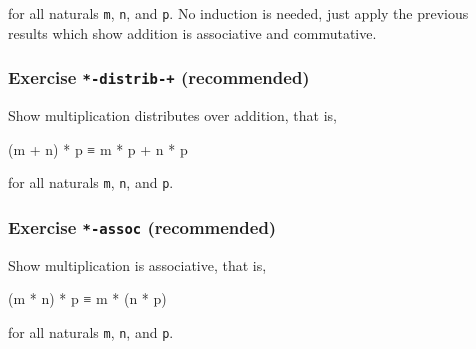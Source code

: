 for all naturals \texttt{m}, \texttt{n}, and \texttt{p}. No induction is
needed, just apply the previous results which show addition is
associative and commutative.

\begin{fence}
\begin{code}%
\>[0]\<%
\end{code}
\end{fence}

\hypertarget{Induction-times-distrib-plus}{%
\subsubsection{\texorpdfstring{Exercise \texttt{*-distrib-+}
(recommended)}{Exercise *-distrib-+ (recommended)}}\label{Induction-times-distrib-plus}}

Show multiplication distributes over addition, that is,

\begin{myDisplay}
(m + n) * p ≡ m * p + n * p
\end{myDisplay}

for all naturals \texttt{m}, \texttt{n}, and \texttt{p}.

\begin{fence}
\begin{code}%
\>[0]\<%
\end{code}
\end{fence}

\hypertarget{Induction-times-assoc}{%
\subsubsection{\texorpdfstring{Exercise \texttt{*-assoc}
(recommended)}{Exercise *-assoc (recommended)}}\label{Induction-times-assoc}}

Show multiplication is associative, that is,

\begin{myDisplay}
(m * n) * p ≡ m * (n * p)
\end{myDisplay}

for all naturals \texttt{m}, \texttt{n}, and \texttt{p}.

\begin{fence}
\begin{code}%
\>[0]\<%
\end{code}
\end{fence}

